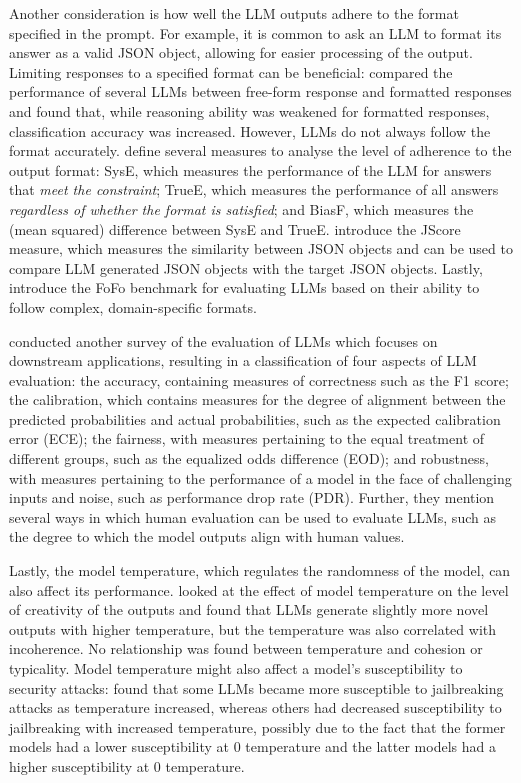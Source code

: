 \documentclass[a4paper]{article}
\begin{document}
Another consideration is how well the LLM outputs adhere to the format specified in the prompt. For example, it is common to ask an LLM to format its answer as a valid JSON object, allowing for easier processing of the output. Limiting responses to a specified format can be beneficial: \textcite{tam2024format} compared the performance of several LLMs between free-form response and formatted responses and found that, while reasoning ability was weakened for formatted responses, classification accuracy was increased. However, LLMs do not always follow the format accurately. \textcite{long2025format} define several measures to analyse the level of adherence to the output format: SysE, which measures the performance of the LLM for answers that \textit{meet the constraint}; TrueE, which measures the performance of all answers \textit{regardless of whether the format is satisfied}; and BiasF, which measures the (mean squared) difference between SysE and TrueE. \textcite{Li2024format} introduce the JScore measure, which measures the similarity between JSON objects and can be used to compare LLM generated JSON objects with the target JSON objects. Lastly, \textcite{xia2024fofo} introduce the FoFo benchmark for evaluating LLMs based on their ability to follow complex, domain-specific formats. 

\textcite{chang2023} conducted another survey of the evaluation of LLMs which focuses on downstream applications, resulting in a classification of four aspects of LLM evaluation: the accuracy, containing measures of correctness such as the F1 score; the calibration, which contains measures for the degree of alignment between the predicted probabilities and actual probabilities, such as the expected calibration error (ECE); the fairness, with measures pertaining to the equal treatment of different groups, such as the equalized odds difference (EOD); and robustness, with measures pertaining to the performance of a model in the face of challenging inputs and noise, such as performance drop rate (PDR). Further, they mention several ways in which human evaluation can be used to evaluate LLMs, such as the degree to which the model outputs align with human values.

Lastly, the model temperature, which regulates the randomness of the model, can also affect its performance. \textcite{peeperkorn2024} looked at the effect of model temperature on the level of creativity of the outputs and found that LLMs generate slightly more novel outputs with higher temperature, but the temperature was also correlated with incoherence. No relationship was found between temperature and cohesion or typicality. Model temperature might also affect a model's susceptibility to security attacks: \textcite{Yu2024} found that some LLMs became more susceptible to jailbreaking attacks as temperature increased, whereas others had decreased susceptibility to jailbreaking with increased temperature, possibly due to the fact that the former models had a lower susceptibility at 0 temperature and the latter models had a higher susceptibility at 0 temperature.
\end{document}
